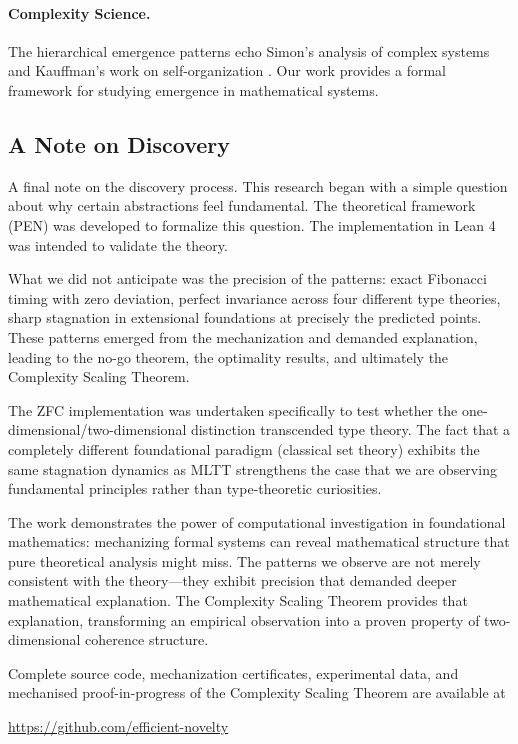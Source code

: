 \documentclass[11pt]{article}
\theoremstyle{definition}
\theoremstyle{remark}
\begin{document}
\paragraph{Complexity Science.}
The hierarchical emergence patterns echo Simon's analysis of complex systems \cite{simon1962architecture} and
Kauffman's work on self-organization \cite{kauffman2000investigations}. Our work provides a formal framework
for studying emergence in mathematical systems.

\subsection{A Note on Discovery}

A final note on the discovery process. This research began with a simple question about why certain
abstractions feel fundamental. The theoretical framework (PEN) was developed to formalize this
question. The implementation in Lean 4 was intended to validate the theory.

What we did not anticipate was the precision of the patterns: exact Fibonacci timing with
zero deviation, perfect invariance across four different type theories, sharp stagnation in extensional
foundations at precisely the predicted points. These patterns emerged from the mechanization and
demanded explanation, leading to the no-go theorem, the optimality results, and ultimately the
Complexity Scaling Theorem.

The ZFC implementation was undertaken specifically to test whether the one-dimensional/two-dimensional distinction transcended type theory. The fact that a completely different foundational
paradigm (classical set theory) exhibits the same stagnation dynamics as MLTT strengthens the
case that we are observing fundamental principles rather than type-theoretic curiosities.

The work demonstrates the power of computational investigation in foundational mathematics:
mechanizing formal systems can reveal mathematical structure that pure theoretical analysis might
miss. The patterns we observe are not merely consistent with the theory---they exhibit precision
that demanded deeper mathematical explanation. The Complexity Scaling Theorem provides that
explanation, transforming an empirical observation into a proven property of two-dimensional
coherence structure.

Complete source code, mechanization certificates, experimental data, and mechanised proof-in-progress of
the Complexity Scaling Theorem are available at \\
\begin{center}
\url{https://github.com/efficient-novelty}
\end{center}
\end{document}
